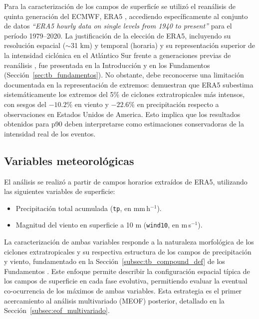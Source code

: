 Para la caracterización de los campos de superficíe se utilizó el reanálisis de quinta generación del ECMWF, ERA5 \citep{hersbach2020era5}, accediendo específicamente al conjunto de datos \textit{``ERA5 hourly data on single levels from 1940 to present''} \citep{hersbach_era5_2023b} para el período 1979--2020. 
La justificación de la elección de ERA5, incluyendo su resolución espacial ($\sim$31 km) y temporal (horaria) y su representación superior de la intensidad ciclónica en el Atlántico Sur frente a generaciones previas de reanálisis \citep{gramcianinov2020analysis}, fue presentada en la Introducción y en los Fundamentos (Sección~\ref{sec:tb_fundamentos}). 
No obstante, debe reconocerse una limitación documentada en la representación de extremos: \citet{chen2024evaluation} demuestran que ERA5 subestima sistemáticamente los extremos del 5\% de ciclones extratropicales más intensos, con sesgos del $-10.2\%$ en viento y $-22.6\%$ en precipitación respecto a observaciones en Estados Unidos de America. 
Esto implica que los resultados obtenidos para p90 deben interpretarse como estimaciones conservadoras de la intensidad real de los eventos.

\subsection{Variables meteorológicas}\label{subsec:variables}

El análisis se realizó a partir de campos horarios extraídos de ERA5, utilizando las siguientes variables de superficie:

\begin{itemize}
    \item Precipitación total acumulada (\texttt{tp}, en mm\,h$^{-1}$).
    \item Magnitud del viento en superficie a 10 m (\texttt{wind10}, en m\,s$^{-1}$).
\end{itemize}

La caracterización de ambas variables responde a la naturaleza morfológica de los ciclones extratropicales y su respectiva estructura de los campos de precipitación y viento, fundamentado en la Sección~\ref{subsec:tb_compound_def} de los Fundamentos . 
Este enfoque permite describir la configuración espacial típica de los campos de superficie en cada fase evolutiva, permitiendo evaluar la eventual co-ocurrencia de los máximos de ambas variables. 
Esta estrategia es el primer acercamiento al análisis multivariado (MEOF) posterior, detallado en la Sección~\ref{subsec:eof_multivariado}.

